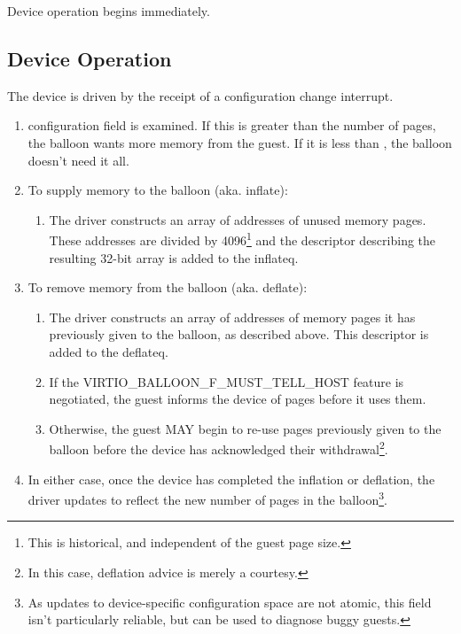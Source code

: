 Device operation begins immediately.

\subsection{Device Operation}\label{sec:Device Types / Memory Balloon Device / Device Operation}

The device is driven by the receipt of a
configuration change interrupt.

\begin{enumerate}
\item {} configuration field is examined. If this is
  greater than the  number of pages, the balloon wants
  more memory from the guest.  If it is less than ,
  the balloon doesn't need it all.

\item To supply memory to the balloon (aka. inflate):
  \begin{enumerate}
  \item The driver constructs an array of addresses of unused memory
    pages. These addresses are divided by 4096\footnote{This is historical, and independent of the guest page size.
} and the descriptor
    describing the resulting 32-bit array is added to the inflateq.
  \end{enumerate}

\item To remove memory from the balloon (aka. deflate):
  \begin{enumerate}
  \item The driver constructs an array of addresses of memory pages
    it has previously given to the balloon, as described above.
    This descriptor is added to the deflateq.

  \item If the VIRTIO_BALLOON_F_MUST_TELL_HOST feature is negotiated, the
    guest informs the device of pages before it uses them.

  \item Otherwise, the guest MAY begin to re-use pages previously
    given to the balloon before the device has acknowledged their
    withdrawal\footnote{In this case, deflation advice is merely a courtesy.
}.
  \end{enumerate}

\item In either case, once the device has completed the inflation or
  deflation, the driver updates  to reflect the new number of pages in the balloon\footnote{As updates to device-specific configuration space are not atomic, this field
isn't particularly reliable, but can be used to diagnose buggy guests.
}.
\end{enumerate}

